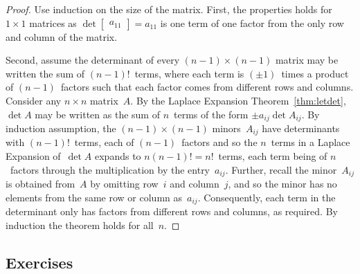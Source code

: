 \begin{proof} 
Use induction on the size of the matrix.
First, the properties holds for \(1\times 1\) matrices as \(\det\begin{bmatrix} a_{11} \end{bmatrix}=a_{11}\) is one term of one factor from the only row and column of the matrix.

Second, assume the determinant of every \((n-1)\times (n-1)\) matrix may be written the sum of \((n-1)!\)~terms, where each term is \((\pm1)\)~times a product of \((n-1)\)~factors such that each factor comes from different rows and columns.
Consider any \(n\times n\) matrix~\(A\).
By the Laplace Expansion Theorem~\ref{thm:letdet}, \(\det A\) may be written as the sum of \(n\)~terms of the form \(\pm a_{ij}\det A_{ij}\).
By induction assumption, the \((n-1)\times(n-1)\) minors~\(A_{ij}\) have determinants with \((n-1)!\)~terms, each of \((n-1)\)~factors and so the \(n\)~terms in a Laplace Expansion of~\(\det A\) expands to \(n(n-1)!=n!\)~terms, each term being of \(n\)~factors through the multiplication by the entry~\(a_{ij}\).
Further, recall the minor~\(A_{ij}\) is obtained from~\(A\) by omitting row~\(i\) and column~\(j\), and so the minor has no elements from the same row or column as~\(a_{ij}\).
Consequently, each term in the determinant only has factors from different rows and columns, as required.
By induction the theorem holds for all~\(n\).
\end{proof}





\begin{comment}
\nakos{} has an interesting section on using determinants to fit some interesting curves, and other determinant uses: such material could go here.
\end{comment}






\subsection{Exercises}




